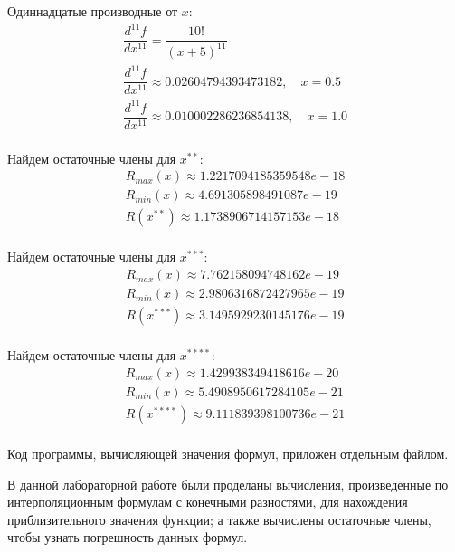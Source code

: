 \documentclass[14pt, a4paper, fleqn]{extarticle}
\begin{document}
	Одиннадцатые производные от $x$:
	\begin{multline*}
	\dfrac{d^{11}f}{dx^{11}} = \dfrac{10!}{(x+5)^{11}} \\
	\dfrac{d^{11}f}{dx^{11}} \approx 0.02604794393473182, \quad x = 0.5\\
	\dfrac{d^{11}f}{dx^{11}} \approx 0.010002286236854138, \quad x = 1.0\\
	\end{multline*}

	Найдем остаточные члены для $x^{**}$:
	\begin{multline*}
	R_{max}(x) \approx 1.2217094185359548	e-18 \\
	R_{min}(x) \approx 4.691305898491087e-19 \\
	R(x^{**}) \approx 1.1738906714157153e-18 \\
	\end{multline*}

	Найдем остаточные члены для $x^{***}$:
	\begin{multline*}
		R_{max}(x) \approx 7.762158094748162e-19 \\
		R_{min}(x) \approx 2.9806316872427965e-19 \\
		R(x^{***}) \approx 3.1495929230145176e-19 \\
	\end{multline*}

	Найдем остаточные члены для $x^{****}$:
	\begin{multline*}
		R_{max}(x) \approx 1.429938349418616e-20 \\
		R_{min}(x) \approx 5.4908950617284105e-21 \\
		R(x^{****}) \approx 9.111839398100736e-21 \\
	\end{multline*}
	
	Код программы, вычисляющей значения формул, приложен отдельным файлом.
	
	В данной лабораторной работе были проделаны вычисления, произведенные по интерполяционным формулам с конечными разностями, для нахождения приблизительного значения функции; а также вычислены остаточные члены, чтобы узнать погрешность данных формул.
	
	
\end{document}

